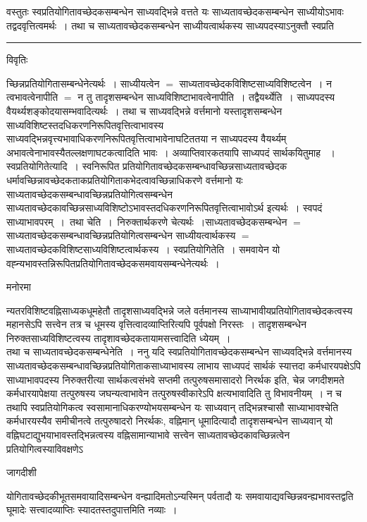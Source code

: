 \documentclass[10pt, openany]{book}
\begin{document}
{{\la वस्तुतः स्वप्रतियोगितावच्छेदकसम्बन्धेन साध्यवद्भिन्ने वत्तते यः साध्यतावच्छेदकसम्बन्धेन साध्यीयोऽभावः तद्वदवृत्तित्वमर्थः~। तथा च साध्यतावच्छेदकसम्बन्धेन साध्यीयत्वार्थकस्य साध्यपदस्याऽनुक्तौ स्वप्रति\textendash}\\
\hrule 
\begin{center}     विवृतिः \end{center}
च्छिन्नप्रतियोगितासम्बन्धेनेत्यर्थः~। साध्यीयत्वेन $=$ साध्यतावच्छेदकविशिष्टसाध्यविशिष्टत्वेन~। न त्वभावत्वेनापीति $=$  न तु तादृशसम्बन्धेन साध्यविशिष्टाभावत्वेनापीति~। तद्वैयर्थ्येति~। साध्यपदस्य वैयर्थ्यशङ्कोदयासम्भवादित्यर्थः~। तथा च साध्यवद्भिन्ने वर्त्तमानो यस्तादृशसम्बन्धेन साध्यविशिष्टस्तदधिकरणनिरूपितवृत्तित्वाभावस्य
साध्यवद्भिन्नवृत्त्यभावाधिकरणनिरूपितवृत्तित्वाभावेनाघटिततया न साध्यपदस्य वैयर्थ्यम् अभावत्वेनाभावस्यैतल्लक्षणाघटकत्वादिति
भावः~। अव्याप्तिवारकतयापि साध्यपदं सार्थकयितुमाह ~। स्वप्रतियोगितेत्यादि~। स्वनिरूपित प्रतियोगितावच्छेदकसम्बन्धावच्छिन्नसाध्यतावच्छेदक धर्मावच्छिन्नावच्छेदकताकप्रतियोगिताकभेदत्वावच्छिन्नाधिकरणे वर्त्तमानो यः साध्यतावच्छेदकसम्बन्धावच्छिन्नप्रतियोगित्वसम्बन्धेन साध्यतावच्छेदकावच्छिन्नसाध्यविशिष्टोऽभावस्तदधिकरणनिरूपितवृत्तित्वाभावोऽर्थ इत्यर्थः~।
स्वपदं साध्याभावपरम्~।~{\la तथा चेति~।}~निरुक्तार्थकरणे चेत्यर्थः~।साध्यतावच्छेदकसम्बन्धेन $=$ साध्यतावच्छेदकसम्बन्धावच्छिन्नप्रतियोगित्वसम्बन्धेन
साध्यीयत्वार्थकस्य $=$ साध्यतावच्छेदकविशिष्टसाध्यविशिष्टत्वार्थकस्य~। {\qt स्वप्रतियोगितेति~}। समवायेन यो वह्न्यभावस्तन्निरूपितप्रतियोगितावच्छेदकसमवायसम्बन्धेनेत्यर्थः~।
\begin{center}   मनोरमा  \end{center}
न्यतरविशिष्टवह्निसाध्यकधूमहेतौ तादृशसाध्यवद्भिन्ने जले वर्तमानस्य साध्याभावीयप्रतियोगितावच्छेदकत्वस्य महानसेऽपि सत्त्वेन तत्र च धूमस्य वृत्तित्वादव्याप्तिरित्यपि पूर्वपक्षो निरस्तः~। तादृशसम्बन्धेन निरुक्तसाध्यविशिष्टत्वस्य तादृशावच्छेदकतायामसत्त्वादिति ध्येयम्~।~\\

तथा च साध्यतावच्छेदकसम्बन्धेनेति~। ननु यदि स्वप्रतियोगितावच्छेदकसम्बन्धेन साध्यवद्भिन्ने वर्त्तमानस्य साध्यतावच्छेदकसम्बन्धावच्छिन्नप्रतियोगिताकसाध्याभावस्य लाभाय
साध्यपदं सार्थकं स्यात्तदा कर्मधारयपक्षेऽपि साध्याभावपदस्य निरुक्तरीत्या सार्थकत्वसंभवे सप्तमी तत्पुरुषसमासादरो निरर्थक इति, चेन्न जगदीशमते कर्मधारयापेक्षया
तत्पुरुषस्य जघन्यत्वाभावेन तत्पुरुषस्वीकारेऽपि क्षत्यभावादिति तु विभावनीयम्~। न च तथापि स्वप्रतियोगिकत्व {\qt स्वसामानाधिकरण्योभयसम्बन्धेन} यः साध्यवान् तद्भिन्नश्चासौ साध्याभावश्चेति {\qt कर्मधारयस्यैव समीचीनत्वे तत्पुरुषादरो निरर्थकः}, वह्निमान् धूमादित्यादौ तादृशसम्बन्धेन साध्यवान् यो वह्निघटाद्युभयाभावस्तद्भिन्नत्वस्य वह्निसामान्याभावे सत्त्वेन साध्यतावच्छेदकावच्छिन्नत्वेन प्रतियोगित्वस्याविवक्षणेऽ
\newpage
\lfoot{}
\begin{center} जागदीशी \end{center}
{\la योगितावच्छेदकीभूतसमवायादिसम्बन्धेन वन्ह्यादिमतोऽन्यस्मिन् पर्वतादौ यः समवायाद्यवच्छिन्नवन्ह्यभावस्तद्वति घूमादेः सत्त्वादव्याप्तिः स्यादतस्तदुपात्तमिति नव्याः~।\\

}}
\end{document}
